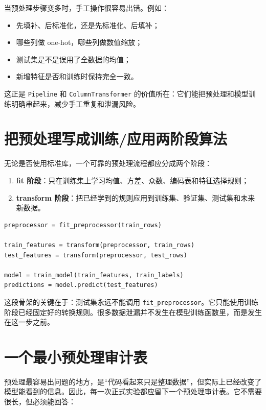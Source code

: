 当预处理步骤变多时，手工操作很容易出错。例如：

\begin{itemize}
    \item 先填补、后标准化，还是先标准化、后填补；
    \item 哪些列做 one-hot，哪些列做数值缩放；
    \item 测试集是不是误用了全数据的均值；
    \item 新增特征是否和训练时保持完全一致。
\end{itemize}

这正是 \texttt{Pipeline} 和 \texttt{ColumnTransformer} 的价值所在：它们能把预处理和模型训练明确串起来，减少手工重复和泄漏风险。

\section{把预处理写成训练/应用两阶段算法}

无论是否使用标准库，一个可靠的预处理流程都应分成两个阶段：

\begin{enumerate}
    \item \textbf{fit 阶段}：只在训练集上学习均值、方差、众数、编码表和特征选择规则；
    \item \textbf{transform 阶段}：把已经学到的规则应用到训练集、验证集、测试集和未来新数据。
\end{enumerate}

\begin{examplebox}[预处理算法骨架]
\begin{lstlisting}[style=pythonstyle]
preprocessor = fit_preprocessor(train_rows)

train_features = transform(preprocessor, train_rows)
test_features = transform(preprocessor, test_rows)

model = train_model(train_features, train_labels)
predictions = model.predict(test_features)
\end{lstlisting}
\end{examplebox}

这段骨架的关键在于：测试集永远不能调用 \texttt{fit\_preprocessor}。它只能使用训练阶段已经固定好的转换规则。很多数据泄漏并不发生在模型训练函数里，而是发生在这一步之前。

\section{一个最小预处理审计表}

预处理最容易出问题的地方，是“代码看起来只是整理数据”，但实际上已经改变了模型能看到的信息。因此，每一次正式实验都应留下一个预处理审计表。它不需要很长，但必须能回答：

